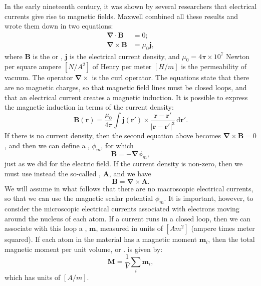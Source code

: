 In the early nineteenth century, it was shown by several researchers that electrical currents give rise to magnetic fields.  Maxwell combined all these results and wrote them down in two equations:
\begin{align}
	\bm{\nabla}\cdot\mathbf{B} &= 0;\\
	\bm{\nabla}\times\mathbf{B} &= \mu_0\mathbf{j},
\end{align}
where $\mathbf{B}$ is the  or , $\mathbf{j}$ is the electrical current density, and $\mu_0=4\pi\times 10^7$ Newton per square ampere $[N/A^2]$ of Henry per meter $[H/m]$ is the permeability of vacuum.  The operator $\bm{\nabla}\times$ is the curl operator.  The equations state that there are no magnetic charges, so that magnetic field lines must be closed loops, and that an electrical current creates a magnetic induction.  It is possible to express the magnetic induction in terms of the current density:
\begin{equation}
	\mathbf{B}(\mathbf{r}) = \frac{\mu_0}{4\pi}\int \mathbf{j}(\mathbf{r}')\times
	\frac{\mathbf{r}-\mathbf{r}'}{\vert\mathbf{r}-\mathbf{r}'\vert^3}\,\mathrm{d}\mathbf{r}'.
\end{equation}
If there is no current density, then the second equation above becomes $\bm{\nabla}\times\mathbf{B}=0$, and then we can define a , $\phi_m$, for which 
\[
	\mathbf{B} = -\bm{\nabla}\phi_m,
\]
just as we did for the electric field.  If the current density is non-zero, then we must use instead the so-called , $\mathbf{A}$, and we have
\[
	\mathbf{B} = \bm{\nabla}\times\mathbf{A}.
\]
We will assume in what follows that there are no macroscopic electrical currents, so that we can use the magnetic scalar potential $\phi_m$.  It is important, however, to consider the microscopic electrical currents associated with electrons moving around the nucleus of each atom.  If a current runs in a closed loop, then we can associate with this loop a , $\mathbf{m}$, measured in units of $[Am^2]$ (ampere times meter squared).   If each atom in the material has a magnetic moment $\mathbf{m}_i$, then the total magnetic moment per unit volume, or . is given by:
\begin{equation}
	\mathbf{M} = \frac{1}{V}\sum_i \mathbf{m}_i,
\end{equation}
which has units of $[A/m]$.

